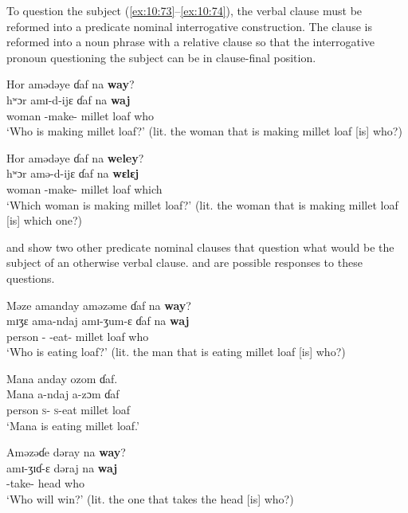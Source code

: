 To question the subject (\ref{ex:10:73}–\ref{ex:10:74}), the verbal clause must be reformed into a predicate nominal interrogative construction. The clause is reformed into a noun phrase with a relative clause so that the interrogative pronoun questioning the subject can be in clause-final position. 

\ea \label{ex:10:73}
Hor  amədəye  ɗaf  na  \textbf{way}?\\
\gll  hʷɔr    amɪ-d-ijɛ  ɗaf   na  \textbf{waj}\\
      woman  {\DEP}-make-{\CL}  {millet loaf}  {\PSP}  who\\
\glt  ‘Who is making millet loaf?’ (lit. the woman that is making millet loaf [is] who?)
\z

\ea \label{ex:10:74}
 Hor  amədəye  ɗaf  na  \textbf{weley}?\\
\gll  hʷɔr    amə-d-ijɛ  ɗaf  na  \textbf{wɛlɛj}\\
      woman  {\DEP}-make-{\CL}  {millet loaf}  {\PSP}  which\\
\glt  ‘Which woman is making millet loaf?’ (lit. the woman that is making millet loaf [is] which one?)
\z

 and  show two other predicate nominal clauses that question what would be the subject of an otherwise verbal clause.  and  are possible responses to these questions. 

\ea \label{ex:10:75}
Məze  amanday  aməzəme  ɗaf  na  \textbf{way}?\\
\gll  mɪʒɛ   ama-ndaj   amɪ-ʒum-ɛ  ɗaf    na   \textbf{waj}\\
      person  {\DEP}-{\PRG}  {\DEP}-eat-{\CL}  {millet loaf}  {\PSP}  who\\
\glt  ‘Who is eating loaf?’ (lit. the man that is eating millet loaf [is] who?)
\z

\ea \label{ex:10:76}
Mana  anday  ozom  ɗaf. \\
\gll Mana   a-ndaj     a-zɔm    ɗaf \\
      person  \textsc{s}-{\PRG}    \textsc{s}-eat    {millet loaf}\\
\glt  ‘Mana is eating millet loaf.’ 
\z

\ea \label{ex:10:77}
Aməzəɗe  dəray  na  \textbf{way}?\\
\gll  amɪ-ʒɪɗ-ɛ    dəraj    na   \textbf{waj}\\
      {\DEP}-take-{\CL}  head  {\PSP}  who\\
\glt  ‘Who will win?’ (lit. the one that takes the head [is] who?)
\z

